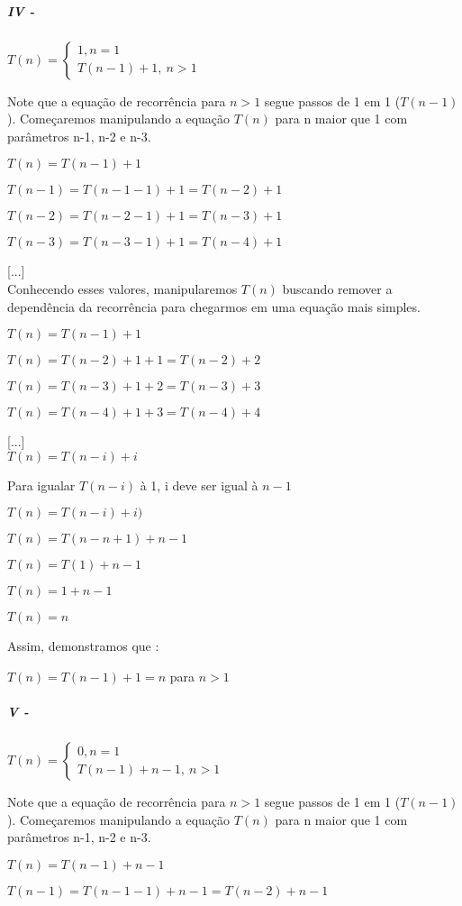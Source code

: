 \documentclass[a4paper, twocolumn]{article}
\theoremstyle{definition}
\begin{document}
\subparagraph{IV - } {$T(n) = \begin{cases} 
		1, n  = 1\\
		T(n-1) + 1, \ n > 1
	\end{cases}$}

Note que a equação de recorrência para $n>1$ segue passos de 1 em 1 ($T(n-1)$). Começaremos manipulando a equação $T(n)$ para n maior que 1 com parâmetros n-1, n-2 e n-3.

$T(n) = T(n-1) + 1$

$T(n-1) = T(n-1-1) + 1 = T(n-2) + 1$

$T(n-2) = T(n-2-1) + 1 = T(n-3) + 1$

$T(n-3) = T(n-3-1) + 1 = T(n-4) + 1$

[...] \\

Conhecendo esses valores, manipularemos $T(n)$ buscando remover a dependência da recorrência para chegarmos em uma equação mais simples.

$T(n) = T(n-1) + 1$

$T(n) = T(n-2) + 1 + 1 = T(n-2) + 2$

$T(n) = T(n-3) + 1 + 2 = T(n-3) + 3$

$T(n) = T(n-4) + 1 + 3 = T(n-4) + 4$

[...] \\

$T(n) = T(n-i) + i$

Para igualar $T(n-i)$ à 1, i deve ser igual à $n-1$

$T(n) = T(n-i) + i)$

$T(n) = T(n - n + 1) + n - 1$

$T(n) = T(1) + n - 1$

$T(n) = 1 + n - 1$

$T(n) = n$

Assim, demonstramos que :

$T(n) = T(n-1) + 1 = n$ para $n > 1$


\subparagraph{V - } {$T(n) = \begin{cases} 
		0, n  = 1\\
		T(n-1) + n - 1, \ n > 1
	\end{cases}$}


Note que a equação de recorrência para $n>1$ segue passos de 1 em 1 ($T(n-1)$). Começaremos manipulando a equação $T(n)$ para n maior que 1 com parâmetros n-1, n-2 e n-3.

$T(n) = T(n-1) + n - 1$

$T(n-1) = T(n-1-1) + n - 1 = T(n-2) + n - 1$
\end{document}
